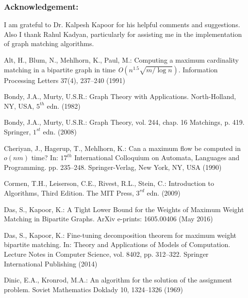 \documentclass[runningheads,a4paper]{llncs}
\begin{document}
\subsubsection*{Acknowledgement:}
I am grateful to Dr. Kalpesh Kapoor for his helpful comments and suggestions. Also I thank Rahul
Kadyan, particularly for assisting me in the implementation of graph matching algorithms.














\begin{thebibliography}{10}
\providecommand{\url}[1]{\texttt{#1}}
\providecommand{\urlprefix}{URL }

Alt, H., Blum, N., Mehlhorn, K., Paul, M.: Computing a maximum cardinality
  matching in a bipartite graph in time \textit{O}$(n^{1.5} \sqrt{ m/\log n})$.
  Information Processing Letters  37(4),  237--240 (1991)

Bondy, J.A., Murty, U.S.R.: Graph Theory with Applications. North-Holland, NY,
  USA, $5^{th}$ edn. (1982)

Bondy, J.A., Murty, U.S.R.: Graph Theory, vol. 244, chap. 16 Matchings, p. 419.
  Springer, $1^{st}$ edn. (2008)

Cheriyan, J., Hagerup, T., Mehlhorn, K.: Can a maximum flow be computed in
  $o(nm)$ time? In: $17^{th}$ International Colloquium on Automata, Languages
  and Programming. pp. 235--248. Springer-Verlag, New York, NY, USA (1990)

Cormen, T.H., Leiserson, C.E., Rivest, R.L., Stein, C.: Introduction to
  Algorithms, Third Edition. The MIT Press, $3^{rd}$ edn. (2009)

{Das}, S., {Kapoor}, K.: {A Tight Lower Bound for the Weights of Maximum Weight
  Matching in Bipartite Graphs}. ArXiv e-prints: 1605.00406  (May 2016)

Das, S., Kapoor, K.: Fine-tuning decomposition theorem for maximum weight
  bipartite matching. In: Theory and Applications of Models of Computation.
  Lecture Notes in Computer Science, vol. 8402, pp. 312--322. Springer
  International Publishing (2014)

Dinic, E.A., Kronrod, M.A.: An algorithm for the solution of the assignment
  problem. Soviet Mathematics Doklady  10,  1324--1326 (1969)


\end{thebibliography}
\end{document}
